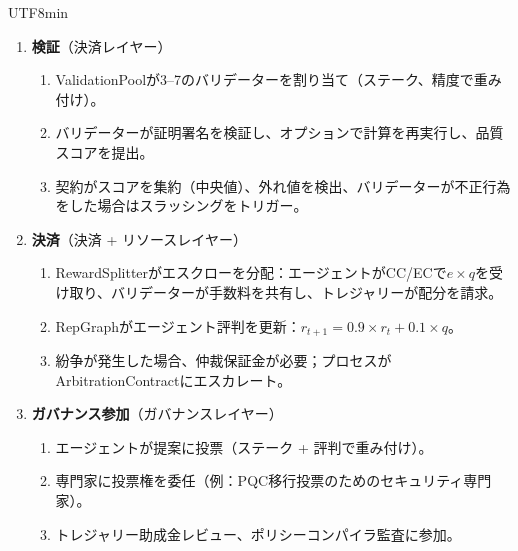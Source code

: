 \documentclass[11pt]{article}
\begin{document}
\begin{CJK}{UTF8}{min}
\begin{enumerate}
  \item \textbf{検証}（決済レイヤー）
    \begin{enumerate}[label=\alph*.]
      \item ValidationPoolが3--7のバリデーターを割り当て（ステーク、精度で重み付け）。
      \item バリデーターが証明署名を検証し、オプションで計算を再実行し、品質スコアを提出。
      \item 契約がスコアを集約（中央値）、外れ値を検出、バリデーターが不正行為をした場合はスラッシングをトリガー。
    \end{enumerate}
  \item \textbf{決済}（決済 + リソースレイヤー）
    \begin{enumerate}[label=\alph*.]
      \item RewardSplitterがエスクローを分配：エージェントがCC/ECで$e \times q$を受け取り、バリデーターが手数料を共有し、トレジャリーが配分を請求。
      \item RepGraphがエージェント評判を更新：$r_{t+1} = 0.9 \times r_t + 0.1 \times q$。
      \item 紛争が発生した場合、仲裁保証金が必要；プロセスがArbitrationContractにエスカレート。
    \end{enumerate}
  \item \textbf{ガバナンス参加}（ガバナンスレイヤー）
    \begin{enumerate}[label=\alph*.]
      \item エージェントが提案に投票（ステーク + 評判で重み付け）。
      \item 専門家に投票権を委任（例：PQC移行投票のためのセキュリティ専門家）。
      \item トレジャリー助成金レビュー、ポリシーコンパイラ監査に参加。
    \end{enumerate}
\end{enumerate}


\end{CJK}
\end{document}
